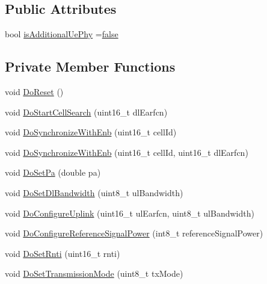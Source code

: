\subsection*{Public Attributes}
\begin{DoxyCompactItemize}
\item 
bool \hyperlink{classns3_1_1MmWaveUePhy_ad7373f6edc2347a40a06db03fe7baffc}{is\+Additional\+Ue\+Phy} =\hyperlink{lte__cqi__generation_8m_ab1bef239d413c4da139c4bac92cd657a}{false}
\end{DoxyCompactItemize}
\subsection*{Private Member Functions}
\begin{DoxyCompactItemize}
\item 
void \hyperlink{classns3_1_1MmWaveUePhy_a84d2de78557298963d879ef9ee72b29a}{Do\+Reset} ()
\item 
void \hyperlink{classns3_1_1MmWaveUePhy_ad1f938018f2e4c80dc00fab085aa8758}{Do\+Start\+Cell\+Search} (uint16\+\_\+t dl\+Earfcn)
\item 
void \hyperlink{classns3_1_1MmWaveUePhy_afacdb4e8bda995b4eef04c081b514eec}{Do\+Synchronize\+With\+Enb} (uint16\+\_\+t cell\+Id)
\item 
void \hyperlink{classns3_1_1MmWaveUePhy_a5e10e8e82a12ee258622490b11c1becd}{Do\+Synchronize\+With\+Enb} (uint16\+\_\+t cell\+Id, uint16\+\_\+t dl\+Earfcn)
\item 
void \hyperlink{classns3_1_1MmWaveUePhy_af945442b021306289159f725e978d91d}{Do\+Set\+Pa} (double pa)
\item 
void \hyperlink{classns3_1_1MmWaveUePhy_a2465a381169e6b05685f15ee92f0012d}{Do\+Set\+Dl\+Bandwidth} (uint8\+\_\+t ul\+Bandwidth)
\item 
void \hyperlink{classns3_1_1MmWaveUePhy_a4894b1abe9804aa56ef81ff0cb98a722}{Do\+Configure\+Uplink} (uint16\+\_\+t ul\+Earfcn, uint8\+\_\+t ul\+Bandwidth)
\item 
void \hyperlink{classns3_1_1MmWaveUePhy_a205c4020f1cedce9f469d112d2b4e338}{Do\+Configure\+Reference\+Signal\+Power} (int8\+\_\+t reference\+Signal\+Power)
\item 
void \hyperlink{classns3_1_1MmWaveUePhy_a2de41d410cc312f8314c370d11e1967e}{Do\+Set\+Rnti} (uint16\+\_\+t rnti)
\item 
void \hyperlink{classns3_1_1MmWaveUePhy_a5ecb505287831e7090a3c3592773022a}{Do\+Set\+Transmission\+Mode} (uint8\+\_\+t tx\+Mode)
\item 

\end{DoxyCompactItemize}
